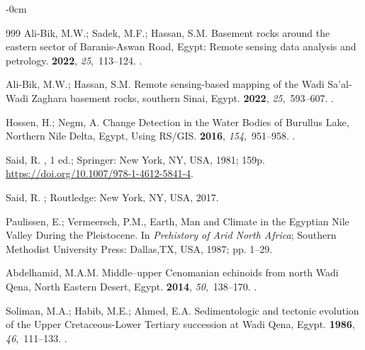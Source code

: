 \documentclass[information,article,accept,pdftex,moreauthors]{Definitions/mdpi}
\begin{document}
\begin{adjustwidth}{-\extralength}{0cm}
\begin{thebibliography}{999}
Ali-Bik, M.W.; Sadek, M.F.; Hassan, S.M.
\newblock Basement rocks around the eastern sector of Baranis-Aswan Road,
  Egypt: Remote sensing data analysis and petrology.
 {\bf
  2022}, {\em 25},~113--124.
.

Ali-Bik, M.W.; Hassan, S.M.
\newblock Remote sensing-based mapping of the Wadi Sa’al-Wadi Zaghara
  basement rocks, southern Sinai, Egypt.
 {\bf
  2022}, {\em 25},~593--607.
.

Hossen, H.; Negm, A.
\newblock Change Detection in the Water Bodies of Burullus Lake, Northern Nile
  Delta, Egypt, Using RS/GIS.
 {\bf 2016}, {\em 154},~951--958.
.

Said, R.
, 1 ed.; Springer:
  New York, NY, USA,  1981;
\newblock 159p. {\url{https://doi.org/10.1007/978-1-4612-5841-4}}.

Said, R.
; Routledge: New York, NY, USA, %
  2017.

Paulissen, E.; Vermeersch, P.M., {Earth, Man and Climate in the Egyptian Nile
  Valley During the Pleistocene}.
\newblock In {\em {Prehistory of Arid North Africa}};  Southern Methodist
  University Press: Dallas,TX, USA,  1987; pp. 1--29.

Abdelhamid, M.A.M.
\newblock Middle--upper Cenomanian echinoids from north Wadi Qena, North
  Eastern Desert, Egypt.
 {\bf 2014}, {\em 50},~138--170.
.

Soliman, M.A.; Habib, M.E.; Ahmed, E.A.
\newblock Sedimentologic and tectonic evolution of the Upper Cretaceous-Lower
  Tertiary succession at Wadi Qena, Egypt.
 {\bf 1986}, {\em 46},~111--133.
.


\end{thebibliography}
\end{adjustwidth}
\end{document}
